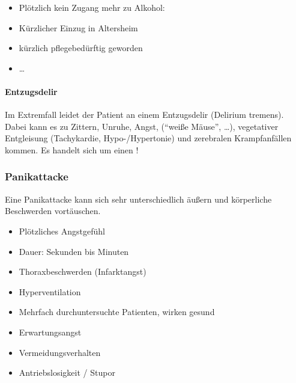 {
\begin{itemize}
  \item Plötzlich kein Zugang mehr zu Alkohol:
  \item Kürzlicher Einzug in Altersheim
  \item kürzlich pflegebedürftig geworden
  \item \ldots
\end{itemize}
}{}{}{}{}













\paragraph{Entzugsdelir} Im Extremfall leidet der Patient
an einem Entzugsdelir (Delirium tremens). Dabei kann  es zu
Zittern, Unruhe, Angst,  ("`weiße Mäuse"', \ldots), vegetativer Entgleisung (Tachykardie,
Hypo-/Hypertonie) und zerebralen Krampfanfällen kommen. Es
handelt sich um einen !



\subsubsection{Panikattacke}

Eine Panikattacke kann sich sehr unterschiedlich äußern und
körperliche Beschwerden vortäuschen.

\begin{itemize}
    \item Plötzliches Angstgefühl
    \item Dauer: Sekunden bis Minuten
    \item Thoraxbeschwerden (Infarktangst)
    \item Hyperventilation 
    \item Mehrfach durchuntersuchte  Patienten, wirken gesund
    \item Erwartungsangst
    \item Vermeidungsverhalten
    \item Antriebslosigkeit / Stupor
\end{itemize}




